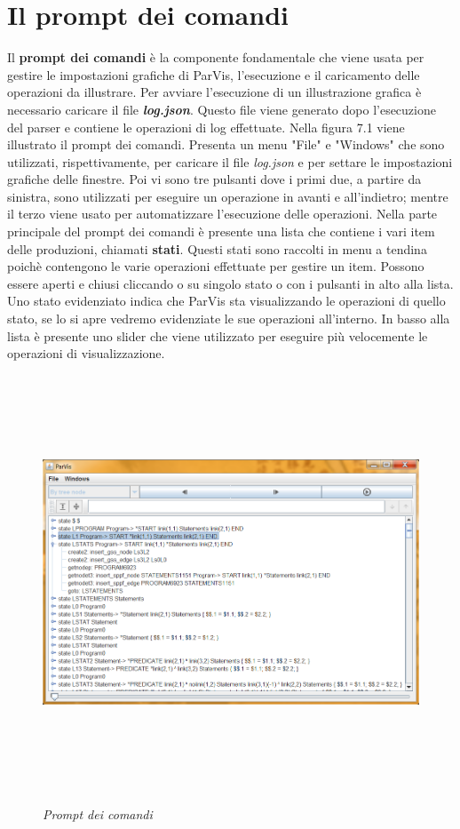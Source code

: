 \section{Il prompt dei comandi}
Il \textbf{prompt dei comandi} è la componente fondamentale che viene usata per gestire le impostazioni grafiche di ParVis, l'esecuzione e il caricamento delle operazioni da illustrare. Per avviare l'esecuzione di un illustrazione grafica è necessario caricare il file \textbf{\textit{log.json}}. Questo file viene generato dopo l'esecuzione del parser e contiene le operazioni di log effettuate. Nella figura 7.1 viene illustrato il prompt dei comandi. Presenta un menu "File" e "Windows" che sono utilizzati, rispettivamente, per caricare il file \textit{log.json} e per settare le impostazioni grafiche delle finestre. Poi vi sono tre pulsanti dove i primi due, a partire da sinistra, sono utilizzati per eseguire un operazione in avanti e all'indietro; mentre il terzo viene usato per automatizzare l'esecuzione delle operazioni. Nella parte principale del prompt dei comandi è presente una lista che contiene i vari item delle produzioni, chiamati \textbf{stati}. Questi stati sono raccolti in menu a tendina poichè contengono le varie operazioni effettuate per gestire un item. Possono essere aperti e chiusi cliccando o su singolo stato o con i pulsanti in alto alla lista. Uno stato evidenziato indica che ParVis sta visualizzando le operazioni di quello stato, se lo si apre vedremo evidenziate le sue operazioni all'interno. In basso alla lista è presente uno slider che viene utilizzato per eseguire più velocemente le operazioni di visualizzazione.\par
\begin{figure}[hbpb]\label{prompt}
	{\includegraphics[height=350pt,width=420pt,scale=0.1]{files/ParVisCommand.png}}
	\caption{\textit{Prompt dei comandi}}
\end{figure}
